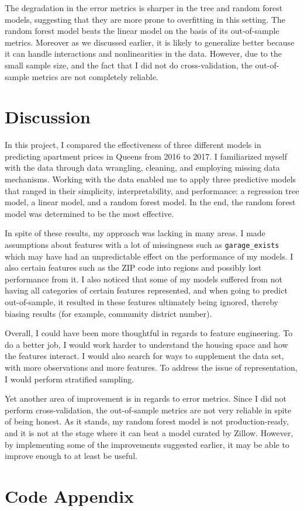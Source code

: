 \documentclass[11pt]{article}
\begin{document}
	The degradation in the error metrics is sharper in the tree and
	random forest models, suggesting that they are more prone to overfitting
	in this setting. The random forest model beats the linear model on the
	basis of its out-of-sample metrics. Moreover as we discussed earlier,
	it is likely to generalize better because it can handle interactions
	and nonlinearities in the data. However, due to the small sample size,
	and the fact that I did not do cross-validation, the out-of-sample
	metrics are not completely reliable.
	\section{Discussion}
	In this project, I compared the effectiveness of three different
	models in predicting apartment prices in Queens from 2016 to 2017.
	I familiarized myself with the data through data wrangling, cleaning,
	and employing missing data mechanisms. Working with the data enabled
	me to apply three predictive models that ranged in their simplicity,
	interpretability, and performance: a regression tree model, a linear
	model, and a random forest model. In the end, the random forest model
	was determined to be the most effective.
	
	In spite of these results, my approach was lacking in many areas.
	I made assumptions about features with a lot of missingness such
	as \verb|garage_exists| which may have had an unpredictable effect
	on the performance of my models. I also certain features such as
	the ZIP code into regions and possibly lost performance from it.
	I also noticed that some of my models suffered from not having
	all categories of certain features represented, and when going to
	predict out-of-sample, it resulted in these features ultimately
	being ignored, thereby biasing results (for example, community
	district number).
	
	Overall, I could have been more thoughtful in regards to feature
	engineering. To do a better job, I would work harder to understand
	the housing space and how the features interact. I would also
	search for ways to supplement the data set, with more observations
	and more features. To address the issue of representation, I
	would perform stratified sampling.
	
	Yet another area of improvement is in regards to error metrics.
	Since I did not perform cross-validation, the out-of-sample metrics
	are not very reliable in spite of being honest. As it stands,
	my random forest model is not production-ready, and it is not
	at the stage where it can beat a model curated by Zillow. However,
	by implementing some of the improvements suggested earlier,
	it may be able to improve enough to at least be useful.
	
	\pagebreak
	\section*{Code Appendix}
	\inputminted[bgcolor=LightGray]{r}{../final_project.Rmd}
	 
	
\end{document}
